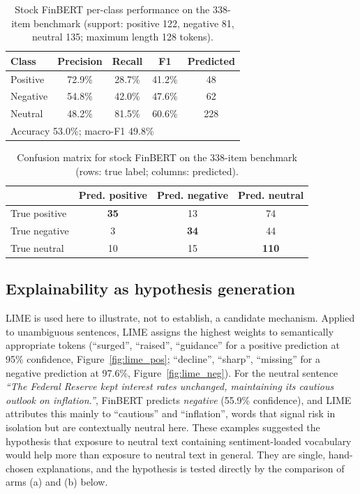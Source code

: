\documentclass{aims}
\numberwithin{equation}{section}
\begin{document}
\begin{table}[ht]
\centering
\caption{Stock FinBERT per-class performance on the 338-item benchmark (support:
positive 122, negative 81, neutral 135; maximum length 128 tokens).}
\label{tab:stock}
\begin{tabular}{lcccc}
\toprule
\textbf{Class} & \textbf{Precision} & \textbf{Recall} & \textbf{F1} & \textbf{Predicted} \\
\midrule
Positive & 72.9\% & 28.7\% & 41.2\% & 48 \\
Negative & 54.8\% & 42.0\% & 47.6\% & 62 \\
Neutral  & 48.2\% & 81.5\% & 60.6\% & 228 \\
\midrule
\multicolumn{5}{l}{Accuracy 53.0\%; macro-F1 49.8\%} \\
\bottomrule
\end{tabular}
\end{table}

\begin{table}[ht]
\centering
\caption{Confusion matrix for stock FinBERT on the 338-item benchmark (rows: true
label; columns: predicted).}
\label{tab:cm}
\begin{tabular}{lccc}
\toprule
 & \textbf{Pred. positive} & \textbf{Pred. negative} & \textbf{Pred. neutral} \\
\midrule
True positive & \textbf{35} & 13 & 74 \\
True negative & 3 & \textbf{34} & 44 \\
True neutral  & 10 & 15 & \textbf{110} \\
\bottomrule
\end{tabular}
\end{table}

\subsection{Explainability as hypothesis generation}
LIME is used here to illustrate, not to establish, a candidate mechanism. Applied
to unambiguous sentences, LIME assigns the highest weights to semantically
appropriate tokens (``surged'', ``raised'', ``guidance'' for a positive prediction
at 95\% confidence, Figure~\ref{fig:lime_pos}; ``decline'', ``sharp'', ``missing''
for a negative prediction at 97.6\%, Figure~\ref{fig:lime_neg}). For the neutral
sentence \emph{``The Federal Reserve kept interest rates unchanged, maintaining its
cautious outlook on inflation.''}, FinBERT predicts \emph{negative} (55.9\%
confidence), and LIME attributes this mainly to ``cautious'' and ``inflation'', words
that signal risk in isolation but are contextually neutral here. These examples
suggested the hypothesis that exposure to neutral text containing sentiment-loaded
vocabulary would help more than exposure to neutral text in general. They are
single, hand-chosen explanations, and the hypothesis is tested directly by the
comparison of arms (a) and (b) below.
\end{document}
